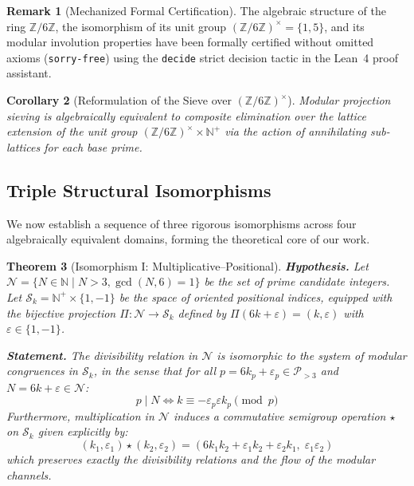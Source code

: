 \documentclass{article}
\numberwithin{equation}{section}
\newcommand{\ZZ}{\mathbb{Z}}
\theoremstyle{plain}
\newtheorem{theorem}{Theorem}[section]
\newtheorem{corollary}[theorem]{Corollary}
\theoremstyle{definition}
\newtheorem{remark}[theorem]{Remark}
\begin{document}
\begin{remark}[Mechanized Formal Certification]
\label{rem:certificacion-z6}
The algebraic structure of the ring $\ZZ/6\ZZ$, the isomorphism of its unit group $(\ZZ/6\ZZ)^\times = \{1, 5\}$, and its modular involution properties have been formally certified without omitted axioms (\texttt{sorry-free}) using the \texttt{decide} strict decision tactic in the Lean~4 proof assistant.
\end{remark}

\begin{corollary}[Reformulation of the Sieve over $(\ZZ/6\ZZ)^\times$]
\label{cor:interpretacion-grupal}
Modular projection sieving is algebraically equivalent to composite elimination over the lattice extension of the unit group $(\ZZ/6\ZZ)^\times \times \mathbb{N}^+$ via the action of annihilating sub-lattices for each base prime.
\end{corollary}

\subsection{Triple Structural Isomorphisms}

We now establish a sequence of three rigorous isomorphisms across four algebraically equivalent domains, forming the theoretical core of our work.

\begin{theorem}[Isomorphism I: Multiplicative--Positional]
\label{thm:iso-I}
\textbf{Hypothesis.} Let $\mathcal{N} = \{N \in \mathbb{N} \mid N > 3, \gcd(N, 6) = 1\}$ be the set of prime candidate integers. Let $\mathcal{S}_k = \mathbb{N}^+ \times \{1, -1\}$ be the space of oriented positional indices, equipped with the bijective projection $\Pi: \mathcal{N} \to \mathcal{S}_k$ defined by $\Pi(6k + \varepsilon) = (k, \varepsilon)$ with $\varepsilon \in \{1, -1\}$.

\textbf{Statement.} The divisibility relation in $\mathcal{N}$ is isomorphic to the system of modular congruences in $\mathcal{S}_k$, in the sense that for all $p = 6k_p + \varepsilon_p \in \mathcal{P}_{>3}$ and $N = 6k + \varepsilon \in \mathcal{N}$:
\begin{equation}
p \mid N \iff k \equiv -\varepsilon_p \varepsilon k_p \pmod p
\end{equation}
Furthermore, multiplication in $\mathcal{N}$ induces a commutative semigroup operation $\star$ on $\mathcal{S}_k$ given explicitly by:
\begin{equation}
(k_1, \varepsilon_1) \star (k_2, \varepsilon_2) = \left( 6k_1k_2 + \varepsilon_1 k_2 + \varepsilon_2 k_1,\; \varepsilon_1 \varepsilon_2 \right)
\end{equation}
which preserves exactly the divisibility relations and the flow of the modular channels.
\end{theorem}
\end{document}
